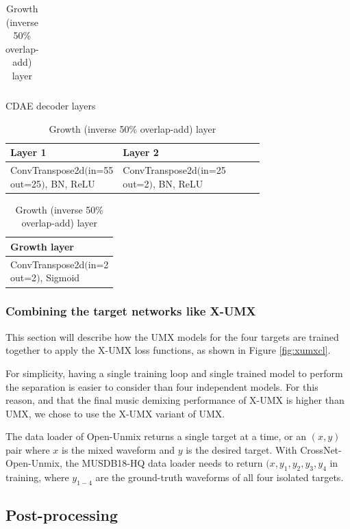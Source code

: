 \documentclass[report.tex]{subfiles}
\begin{document}
\begin{table}[ht]
\begin{tabular}{ |l|l|l|l|l| }
	 \hline
\end{tabular}
	\vspace{1em}
	\caption{CDAE decoder layers}
	\label{table:convtable4}
\begin{tabular}{ |l|l|l|l|l| }
	 \hline
		Layer 1 & Layer 2 \\
	 \hline
	 \hline
		ConvTranspose2d$\Big($\makecell[l]{in=55\\out=25}$\Big)$, BN, ReLU & ConvTranspose2d$\Big($\makecell[l]{in=25\\out=2}$\Big)$, BN, ReLU \\
	 \hline
\end{tabular}
	\vspace{1em}
	\caption{Growth (inverse 50\% overlap-add) layer}
	\label{table:convtable5}
\begin{tabular}{ |l| }
	 \hline
		Growth layer \\
	 \hline
	 \hline
		ConvTranspose2d$\Big($\makecell[l]{in=2\\out=2}$\Big)$, Sigmoid \\
	 \hline
\end{tabular}
\end{table}

\subsubsection{Combining the target networks like X-UMX}
\label{sec:xumxinc}

This section will describe how the UMX models for the four targets are trained together to apply the X-UMX loss functions, as shown in Figure \ref{fig:xumxcl}.

For simplicity, having a single training loop and single trained model to perform the separation is easier to consider than four independent models. For this reason, and that the final music demixing performance of X-UMX is higher than UMX, we chose to use the X-UMX variant of UMX.

The data loader of Open-Unmix returns a single target at a time, or an $(x, y)$ pair where $x$ is the mixed waveform and $y$ is the desired target. With CrossNet-Open-Unmix, the MUSDB18-HQ data loader needs to return $(x, y_{1}, y_{2}, y_{3}, y_{4}$ in training, where $y_{1-4}$ are the ground-truth waveforms of all four isolated targets.

\newpagefill

\subsection{Post-processing}
\label{sec:postprocessing}
\end{document}
